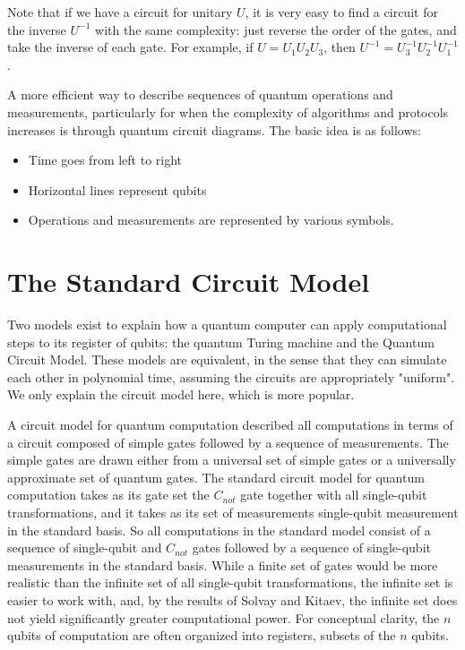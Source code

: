 Note that if we have a circuit for unitary $U$, it is very easy to find a circuit for the inverse $U^{-1}$ with the same complexity: just reverse the order of the gates, and take the inverse of each gate. For example, if $U=U_1U_2U_3$, then $U^{-1}=U_3^{-1} U_2^{-1}U_1^{-1}$.


A more efficient way to describe sequences of quantum operations and measurements, particularly for when the complexity of algorithms and protocols increases is through quantum circuit diagrams. The basic idea is as follows:
\begin{itemize}
    \item Time goes from left to right
    \item Horizontal lines represent qubits
    \item Operations and measurements are represented by various symbols.
\end{itemize}

\section{The Standard Circuit Model}
Two models exist to explain how a quantum computer can apply computational steps to its register of qubits: the quantum Turing machine and the Quantum Circuit Model. These models are equivalent, in the sense that they can simulate each other in polynomial time, assuming the circuits are appropriately "uniform". We only explain the circuit model here, which is more popular.

A circuit model for quantum computation described all computations in terms of a circuit composed of simple gates followed by a sequence of measurements. The simple gates are drawn either from a universal set of simple gates or a universally approximate set of quantum gates. The standard circuit model for quantum computation takes as its gate set the $C_{not}$ gate together with all single-qubit transformations, and it takes as its set of measurements single-qubit measurement in the standard basis. So all computations in the standard model consist of a sequence of single-qubit and $C_{not}$ gates followed by a sequence of single-qubit measurements in the standard basis. While a finite set of gates would be more realistic than the infinite set of all single-qubit transformations, the infinite set is easier to work with, and, by the results of Solvay and Kitaev, the infinite set does not yield significantly greater computational power. For conceptual clarity, the $n$ qubits of computation are often organized into registers, subsets of the $n$ qubits.

